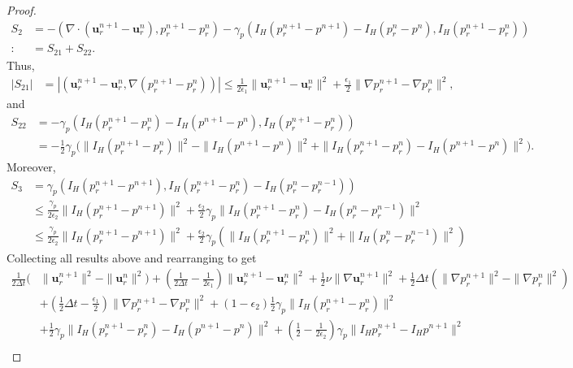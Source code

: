\documentclass[10pt,twoside,openany,UTF8,CJK]{article}
\begin{document}
\begin{proof}
$$\begin{aligned}
			S_2 &= -\left(\nabla \cdot (\boldsymbol{u}_r^{n+1} - \boldsymbol{u}_r^{n}), p^{n+1}_r-p^n_r\right) - \gamma_p(I_H(p_r^{n+1} - p^{n+1}) - I_H(p_r^{n} - p^{n}), I_H(p^{n+1}_r-p^n_r)) \\
			:&= S_{21} + S_{22}.
    	\end{aligned}
        $$	
		Thus, 
		$$
		\begin{aligned}
			|S_{21}| &= \left|\left(\boldsymbol{u}_r^{n+1} - \boldsymbol{u}_r^{n}, \nabla(p^{n+1}_r-p^n_r)\right)\right| \leq \frac{1}{2\epsilon_{1}}\|\boldsymbol{u}_r^{n+1} - \boldsymbol{u}_r^{n}\|^2 + \frac{\epsilon_{1}}{2}\|\nabla p^{n+1}_r - \nabla p^n_r\|^2,
		\end{aligned}
		$$	
		and
		$$
		\begin{aligned}
			S_{22} &= - \gamma_p(I_H(p_r^{n+1} - p_r^{n}) - I_H(p^{n+1} - p^{n}), I_H(p^{n+1}_r-p^n_r)) \\
			 &= -\frac12\gamma_p\bigg(\|I_H(p^{n+1}_r-p^n_r)\|^2 - \|I_H(p^{n+1} - p^{n})\|^2 + \|I_H(p_r^{n+1} - p_r^{n}) - I_H(p^{n+1} - p^{n})\|^2\bigg).
		\end{aligned}
		$$
		Moreover, 
		$$
		\begin{aligned}
			S_3 &= \gamma_p\left(I_H(p^{n+1}_r - p^{n+1}), I_H(p^{n+1}_r - p^{n}_r) - I_H(p^{n}_r - p^{n-1}_r)\right) \\
			&\leq \frac{\gamma_p}{2\epsilon_{2}}\|I_H(p^{n+1}_r - p^{n+1})\|^2 + \frac{\epsilon_{2}}{2}\gamma_p\|I_H(p^{n+1}_r - p^{n}_r) - I_H(p^{n}_r - p^{n-1}_r)\|^2 \\
			&\leq \frac{\gamma_p}{2\epsilon_{2}}\|I_H(p^{n+1}_r - p^{n+1})\|^2 + \frac{\epsilon_{2}}{2}\gamma_p\left(\|I_H(p^{n+1}_r - p^{n}_r)\|^2 + \|I_H(p^{n}_r - p^{n-1}_r)\|^2\right)
		\end{aligned}
		$$
		Collecting all results above and rearranging to get
		$$
		\begin{aligned}
			\frac{1}{2\Delta t}(&\|\boldsymbol{u}_r^{n+1}\|^2 - \|\boldsymbol{u}_r^{n}\|^2) + \left(\frac{1}{2\Delta t} - \frac{1}{2\epsilon_{1}} \right)\|\boldsymbol{u}_r^{n+1} - \boldsymbol{u}_r^{n}\|^2 + \frac12\nu\|\nabla \boldsymbol{u}^{n+1}_r\|^2 + \frac12\Delta t\left(\|\nabla p^{n+1}_r\|^2 - \|\nabla p^{n}_r\|^2\right) \\
			&+ \left(\frac12\Delta t - \frac{\epsilon_{1}}{2}\right)\|\nabla p^{n+1}_r - \nabla p^{n}_r\|^2 + \left(1 - \epsilon_{2}\right)\frac12\gamma_p\|I_H(p^{n+1}_r-p^n_r)\|^2 \\
			&+ \frac12\gamma_p\|I_H(p_r^{n+1} - p_r^{n}) - I_H(p^{n+1} - p^{n})\|^2 + \left(\frac12 - \frac{1}{2\epsilon_{2}}\right)\gamma_p\|I_Hp^{n+1}_r - I_H p^{n+1}\|^2 \\

\end{aligned}$$
\end{proof}
\end{document}
